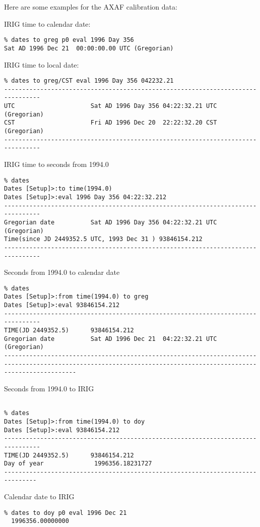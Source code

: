 \documentclass{article}
\begin{document}
Here are some examples for the AXAF calibration data:

IRIG time to calendar date:
\begin{verbatim}
% dates to greg p0 eval 1996 Day 356 
Sat AD 1996 Dec 21  00:00:00.00 UTC (Gregorian)
\end{verbatim}

IRIG time to local date:
\begin{verbatim}
% dates to greg/CST eval 1996 Day 356 042232.21
--------------------------------------------------------------------------------
UTC                     Sat AD 1996 Day 356 04:22:32.21 UTC (Gregorian)
CST                     Fri AD 1996 Dec 20  22:22:32.20 CST (Gregorian)
--------------------------------------------------------------------------------
\end{verbatim}

IRIG time to seconds from 1994.0
\begin{verbatim}
% dates
Dates [Setup]>:to time(1994.0)
Dates [Setup]>:eval 1996 Day 356 04:22:32.212
--------------------------------------------------------------------------------
Gregorian date          Sat AD 1996 Day 356 04:22:32.21 UTC (Gregorian)
Time(since JD 2449352.5 UTC, 1993 Dec 31 ) 93846154.212
--------------------------------------------------------------------------------
\end{verbatim}

Seconds from 1994.0 to calendar date
\begin{verbatim}
% dates
Dates [Setup]>:from time(1994.0) to greg
Dates [Setup]>:eval 93846154.212
--------------------------------------------------------------------------------
TIME(JD 2449352.5)      93846154.212
Gregorian date          Sat AD 1996 Dec 21  04:22:32.21 UTC (Gregorian)
----------------------------------------------------------------------------------------------------------------------------------------------------------------
\end{verbatim}

Seconds from 1994.0 to IRIG
\begin{verbatim}

% dates
Dates [Setup]>:from time(1994.0) to doy
Dates [Setup]>:eval 93846154.212
--------------------------------------------------------------------------------
TIME(JD 2449352.5)      93846154.212
Day of year              1996356.18231727
-------------------------------------------------------------------------------
\end{verbatim}

Calendar date to IRIG


\begin{verbatim}
% dates to doy p0 eval 1996 Dec 21
  1996356.00000000
\end{verbatim}
\end{document}
